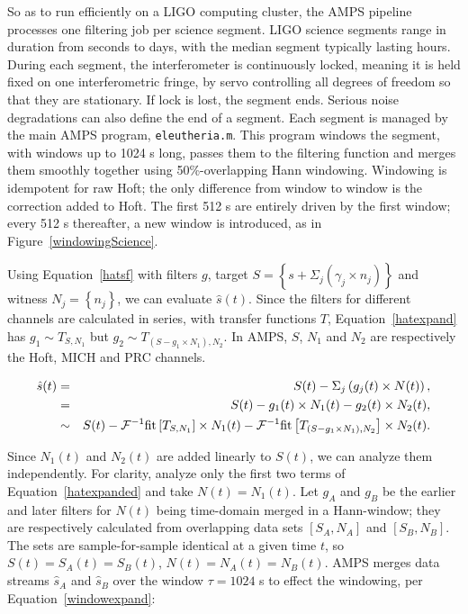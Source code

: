 So as to run efficiently on a LIGO computing cluster, the AMPS pipeline processes one filtering job per science segment. LIGO science segments range in duration from seconds to days, with the median segment typically lasting hours. During each segment, the interferometer is continuously locked, meaning it is held fixed on one interferometric fringe, by servo controlling all degrees of freedom so that they are stationary. If lock is lost, the segment ends. Serious noise degradations can also define the end of a segment. Each segment is managed by the main AMPS program, \texttt{eleutheria.m}. This program windows the segment, with windows up to 1024 s long, passes them to the filtering function and merges them smoothly together using 50\%-overlapping Hann windowing. Windowing is idempotent for raw Hoft; the only difference from window to window is the correction added to Hoft. The first 512 s are entirely driven by the first window; every 512 s thereafter, a new window is introduced, as in Figure~\ref{windowingScience}.


Using Equation~\ref{hatsf} with filters $g$, target $S = \left\{ s + \Sigma_j \left(\gamma_j \times n_j\right)\right\}$ and witness $N_j = \left\{ n_{j} \right\}$, we can evaluate  $\hat{s} (t)$. Since the filters for different channels are calculated in series, with transfer functions $T$, Equation~\ref{hatexpand} has $g_1 \sim T_{S,N_1}$ but $g_2 \sim T_{\left( S-g_1 \times N_1 \right),N_2}$. In AMPS, $S$, $N_1$ and $N_2$ are respectively the Hoft, MICH and PRC channels.

            \begin{eqnarray}
            \hat{s} (t) &=& S (t) - \Sigma_j \left(g_{j} (t) \times N (t)\right) \label{hatexpand}, \\
		&=& S (t) - g_1 (t) \times N_1 (t) - g_2 (t) \times N_2 (t) \label{hatexpanded},\\
&\sim& S (t) - \mathcal{F}^{-1} \textup{fit}\left[ T_{S,N_1} \right] \times N_1 (t) - \mathcal{F}^{-1} \textup{fit}\left[T_{\left( S-g_1 \times N_1 \right),N_2} \right] \times N_2 (t).
            \end{eqnarray} 
		

	Since $N_1(t)$ and $N_2(t)$ are added linearly to $S(t)$, we can analyze them independently. 
For clarity, analyze only the first two terms of Equation~\ref{hatexpanded} and take $N(t) = N_1(t)$. Let $g_{A}$ and $g_{B}$ be the earlier and later filters for $N(t)$ being time-domain merged in a Hann-window; they are respectively calculated from overlapping data sets $[S_A, N_A]$ and $[S_B, N_B]$. The sets are sample-for-sample identical at a given time $t$, so $S(t)=S_A(t) = S_B(t)$, $N(t)=N_A(t) = N_B(t)$. AMPS merges data streams $\hat{s}_A$ and $\hat{s}_B$ over the window $\tau = 1024$ s to effect the windowing, per Equation~\ref{windowexpand}: 

